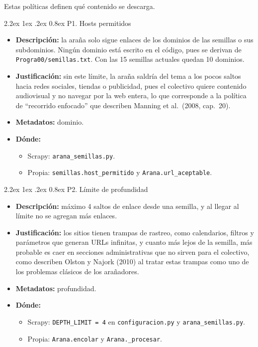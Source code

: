 \documentclass[11pt,spanish]{article}
\makeatletter
\renewcommand\paragraph{\@startsection{paragraph}{4}{\z@}%
  {2.2ex \@plus1ex \@minus.2ex}%
  {0.8ex}%
  {\normalfont\normalsize\bfseries}}
\makeatother
\begin{document}
Estas políticas definen qué contenido se descarga.

\paragraph{P1. Hosts permitidos}

\begin{itemize}[label=\textbullet, leftmargin=*]
    \item \textbf{Descripción:} la araña solo sigue enlaces de los dominios de las semillas o sus subdominios. Ningún dominio está escrito en el código, pues se derivan de \texttt{Progra00/semillas.txt}. Con las 15 semillas actuales quedan 10 dominios.
    \item \textbf{Justificación:} sin este límite, la araña saldría del tema a los pocos saltos hacia redes sociales, tiendas o publicidad, pues el colectivo quiere contenido audiovisual y no navegar por la web entera, lo que corresponde a la política de ``recorrido enfocado'' que describen Manning et al.\ (2008, cap.\ 20).
    \item \textbf{Metadatos:} dominio.
    \item \textbf{Dónde:}
    \begin{itemize}[label=--, leftmargin=*]
        \item Scrapy: \texttt{arana\_semillas.py}.
        \item Propia: \texttt{semillas.host\_permitido} y \texttt{Arana.url\_aceptable}.
    \end{itemize}
\end{itemize}

\paragraph{P2. Límite de profundidad}

\begin{itemize}[label=\textbullet, leftmargin=*]
    \item \textbf{Descripción:} máximo 4 saltos de enlace desde una semilla, y al llegar al límite no se agregan más enlaces.
    \item \textbf{Justificación:} los sitios tienen trampas de rastreo, como calendarios, filtros y parámetros que generan URLs infinitas, y cuanto más lejos de la semilla, más probable es caer en secciones administrativas que no sirven para el colectivo, como describen Olston y Najork (2010) al tratar estas trampas como uno de los problemas clásicos de los arañadores.
    \item \textbf{Metadatos:} profundidad.
    \item \textbf{Dónde:}
    \begin{itemize}[label=--, leftmargin=*]
        \item Scrapy: \texttt{DEPTH\_LIMIT = 4} en \texttt{configuracion.py} y \texttt{arana\_semillas.py}.
        \item Propia: \texttt{Arana.encolar} y \texttt{Arana.\_procesar}.
    \end{itemize}
\end{itemize}
\end{document}
